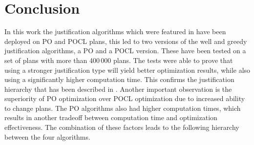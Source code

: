 \chapter{Conclusion}


In this work the justification algorithms which were featured in \cite{Justification} have been deployed on PO and POCL plans,
this led to two versions of the well and greedy justification algorithms, a PO and a POCL version.
These have been tested on a set of plans with more than 400\,000 plans.
The tests were able to prove that using a stronger justification type will yield better optimization results,
while also using a significantly higher computation time.
This confirms the justification hierarchy that has been described in \cite{Justification}.
Another important observation is the superiority of PO optimization over POCL optimization due to increased ability to change plans. 
The PO algorithms also had higher computation times,
which results in another tradeoff between computation time and optimization effectiveness. 
The combination of these factors leads to the following hierarchy between the four algorithms.

